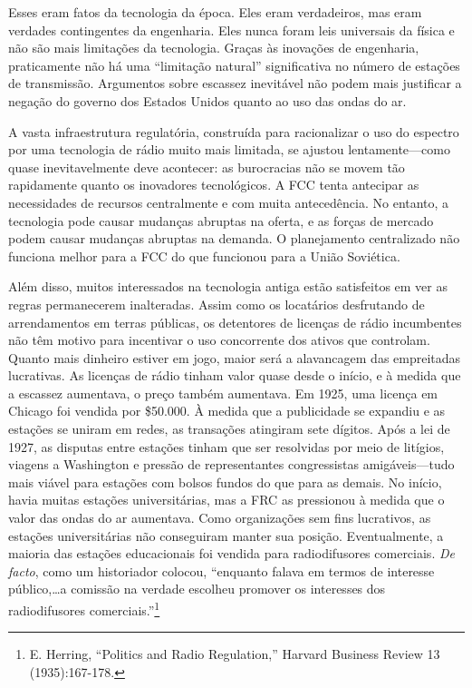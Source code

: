 \documentclass{book}
\newcommand{\ingles}[1]{\textit{#1}}
\begin{document}
Esses eram fatos da tecnologia da época. Eles eram verdadeiros, mas eram verdades
contingentes da engenharia. Eles nunca foram leis universais da física e não são
mais limitações da tecnologia. Graças às inovações de engenharia, praticamente
não há uma ``limitação natural'' significativa no número de estações de transmissão.
Argumentos sobre escassez inevitável não podem mais justificar a negação do governo
dos Estados Unidos quanto ao uso das ondas do ar.

A vasta infraestrutura regulatória, construída para racionalizar o uso do espectro
por uma tecnologia de rádio muito mais limitada, se ajustou lentamente---como
quase inevitavelmente deve acontecer: as burocracias não se movem tão rapidamente
quanto os inovadores tecnológicos. A FCC tenta antecipar as necessidades de recursos
centralmente e com muita antecedência. No entanto, a tecnologia pode causar mudanças
abruptas na oferta, e as forças de mercado podem causar mudanças abruptas na demanda.
O planejamento centralizado não funciona melhor para a FCC do que funcionou para
a União Soviética.

Além disso, muitos interessados na tecnologia antiga estão satisfeitos em ver as
regras permanecerem inalteradas. Assim como os locatários desfrutando de
arrendamentos em terras públicas, os detentores de licenças de rádio incumbentes
não têm motivo para incentivar o uso concorrente dos ativos que controlam. Quanto
mais dinheiro estiver em jogo, maior será a alavancagem das empreitadas lucrativas.
As licenças de rádio tinham valor quase desde o início, e à medida que a escassez
aumentava, o preço também aumentava. Em 1925, uma licença em Chicago foi vendida
por \$50.000. À medida que a publicidade se expandiu e as estações se uniram em
redes, as transações atingiram sete dígitos. Após a lei de 1927, as disputas entre
estações tinham que ser resolvidas por meio de litígios, viagens a Washington e
pressão de representantes congressistas amigáveis---tudo mais viável para estações
com bolsos fundos do que para as demais. No início, havia muitas estações
universitárias, mas a FRC as pressionou à medida que o valor das ondas do ar
aumentava. Como organizações sem fins lucrativos, as estações universitárias não
conseguiram manter sua posição. Eventualmente, a maioria das estações educacionais
foi vendida para radiodifusores comerciais. \ingles{De facto}, como um historiador
colocou, ``enquanto falava em termos de interesse público,\ldots a comissão na
verdade escolheu promover os interesses dos radiodifusores comerciais.''\footnote{E.
Herring, “Politics and Radio Regulation,” Harvard Business Review 13 (1935):167-178.}
\end{document}
